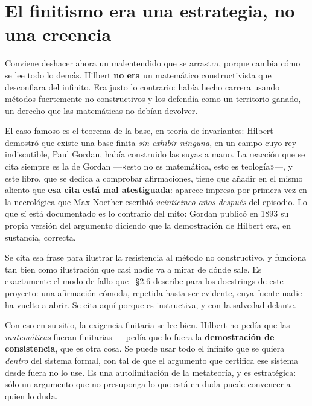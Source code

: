\section{El finitismo era una estrategia, no una creencia}
\label{sec:finitismo-estrategia}

Conviene deshacer ahora un malentendido que se arrastra, porque cambia cómo se lee todo lo demás.
Hilbert \textbf{no era} un matemático constructivista que desconfiara del infinito. Era justo lo
contrario: había hecho carrera usando métodos fuertemente no constructivos y los defendía como un
territorio ganado, un derecho que las matemáticas no debían devolver.

El caso famoso es el teorema de la base, en teoría de invariantes: Hilbert demostró que existe una
base finita \emph{sin exhibir ninguna}, en un campo cuyo rey indiscutible, Paul Gordan, había
construido las suyas a mano. La reacción que se cita siempre es la de Gordan —«esto no es
matemática, esto es teología»—, y este libro, que se dedica a comprobar afirmaciones, tiene que
añadir en el mismo aliento que \textbf{esa cita está mal atestiguada}: aparece impresa por primera
vez en la necrológica que Max Noether escribió \emph{veinticinco años después} del episodio. Lo que
sí está documentado es lo contrario del mito: Gordan publicó en 1893 su propia versión del
argumento diciendo que la demostración de Hilbert era, en sustancia, correcta.

\begin{observacion}
Se cita esa frase para ilustrar la resistencia al método no constructivo, y funciona tan bien como
ilustración que casi nadie va a mirar de dónde sale. Es exactamente el modo de fallo que
~§2.6 describe para los docstrings de este proyecto: una afirmación cómoda,
repetida hasta ser evidente, cuya fuente nadie ha vuelto a abrir. Se cita aquí porque es
instructiva, y con la salvedad delante.
\end{observacion}

Con eso en su sitio, la exigencia finitaria se lee bien. Hilbert no pedía que las
\emph{matemáticas} fueran finitarias — pedía que lo fuera la \textbf{demostración de
consistencia}, que es otra cosa. Se puede usar todo el infinito que se quiera \emph{dentro} del
sistema formal, con tal de que el argumento que certifica ese sistema desde fuera no lo use. Es una
autolimitación de la metateoría, y es estratégica: sólo un argumento que no presuponga lo que está
en duda puede convencer a quien lo duda.

